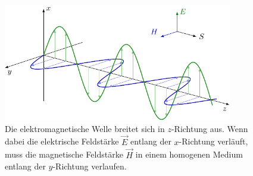 \begin{figure}
    \centering
    \includegraphics[width=100mm]{papers/opt/images/electromagnetic_wave_1.pdf}
    \caption{Die elektromagnetische Welle breitet sich in $z$-Richtung aus. 
    Wenn dabei die elektrische Feldstärke $\vec{E}$ entlang der $x$-Richtung verläuft, muss die magnetische Feldstärke $\vec{H}$ 
    in einem homogenen Medium entlang der $y$-Richtung verlaufen.}
    \label{opt:fig:electromagnetic_wave_1}
\end{figure}

